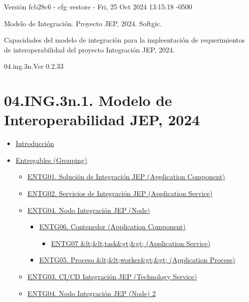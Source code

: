 \documentclass[
  paper=a4,
  ,captions=tableheading
]{scrartcl}
\providecommand{\tightlist}{%
  \setlength{\itemsep}{0pt}\setlength{\parskip}{0pt}}
\begin{document}
Versión fcb28c6 - cfg--restore - Fri, 25 Oct 2024 13:15:18 -0500

Modelo de Integración. Proyecto JEP, 2024. Softgic.

Capacidades del modelo de integración para la impleentación de
requerimientos de interoperabilidad del proyecto Integración JEP, 2024.

04.ing.3n.Ver 0.2.33

\section{04.ING.3n.1. Modelo de Interoperabilidad JEP,
2024}\label{sec:ing.3n.1.-modelo-de-interoperabilidad-jep-2024-1}

\begin{itemize}
\tightlist
\item
  \hyperref[Introducciuxf3n]{Introducción}
\item
  \hyperref[entregables-grouping]{Entregables (Grouping)}

  \begin{itemize}
  \tightlist
  \item
    \hyperref[entg01.-soluciuxf3n-de-integraciuxf3n-jep-application-component]{ENTG01.
    Solución de Integración JEP (Application Component)}
  \item
    \hyperref[entg02.-servicios-de-integraciuxf3n-jep-application-service]{ENTG02.
    Servicios de Integración JEP (Application Service)}
  \item
    \hyperref[entg04.-nodo-integraciuxf3n-jep-node]{ENTG04. Nodo
    Integración JEP (Node)}

    \begin{itemize}
    \tightlist
    \item
      \hyperref[entg06.-contenedor-application-component]{ENTG06.
      Contenedor (Application Component)}

      \begin{itemize}
      \tightlist
      \item
        \hyperref[entg07-ltlttaskgtgt-application-service]{ENTG07
        \&lt;\&lt;task\&gt;\&gt; (Application Service)}
      \end{itemize}
    \item
      \hyperref[entg05.-proceso-ltltworkergtgt-application-process]{ENTG05.
      Proceso \&lt;\&lt;worker\&gt;\&gt; (Application Process)}
    \end{itemize}
  \item
    \hyperref[entg03.-cicd-integraciuxf3n-jep-technology-service]{ENTG03.
    CI/CD Integración JEP (Technology Service)}
  \item
    \hyperref[entg04.-nodo-integraciuxf3n-jep-node-2]{ENTG04. Nodo
    Integración JEP (Node) 2}


\end{itemize}
\end{itemize}
\end{document}
